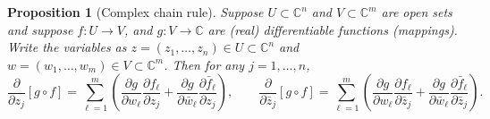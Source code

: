 \documentclass[12pt,openany]{book}
\newcommand{\C}{{\mathbb{C}}}
\theoremstyle{plain}
\newtheorem{prop}[thm]{Proposition}
\theoremstyle{remark}
\theoremstyle{definition}
\theoremstyle{exercise}
\theoremstyle{example}
\begin{document}
\begin{prop}[Complex chain rule]
Suppose 
$U \subset \C^n$ and $V \subset \C^m$ are open sets and suppose
$f \colon U \to V$, and $g \colon V \to \C$ are (real) differentiable
functions (mappings).  Write the variables as
$z = (z_1,\ldots,z_n) \in U \subset \C^n$ and $w = (w_1,\ldots,w_m) \in V
\subset \C^m$.  Then for any $j=1,\ldots,n$,
\begin{equation} \label{eq:chainrule}
\frac{\partial}{\partial z_j} \left[ g \circ f \right]
=
\sum_{\ell=1}^m \left(
\frac{\partial g}{\partial w_\ell}
\frac{\partial f_\ell}{\partial z_j}
+
\frac{\partial g}{\partial \bar{w}_\ell}
\frac{\partial \bar{f}_\ell}{\partial z_j}
\right),  \qquad
\frac{\partial}{\partial \bar{z}_j} \left[ g \circ f \right]
=
\sum_{\ell=1}^m \left(
\frac{\partial g}{\partial w_\ell}
\frac{\partial f_\ell}{\partial \bar{z}_j}
+
\frac{\partial g}{\partial \bar{w}_\ell}
\frac{\partial \bar{f}_\ell}{\partial \bar{z}_j}
\right) .
\end{equation}
\end{prop}
\end{document}
